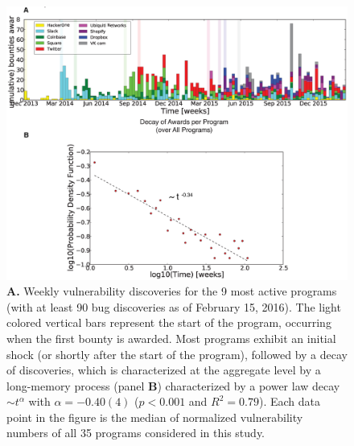 \begin{figure}[Ht]
\begin{center}
\includegraphics[width=13cm]{figures/timeline.eps}
\caption{{\bf A.} Weekly vulnerability discoveries for the 9 most active programs (with at least 90 bug discoveries as of February 15, 2016). The light colored vertical bars represent the start of the program, occurring when the first bounty is awarded. Most programs exhibit an initial shock (or shortly after the start of the program), followed by a decay of discoveries, which is characterized at the aggregate level by a long-memory process (panel {\bf B}) characterized by a power law decay $\sim t^{\alpha}$ with $\alpha = -0.40(4)$ ($p < 0.001$ and $R^2 = 0.79$). Each data point in the figure is the median of normalized vulnerability numbers of all 35 programs considered in this study.}
\label{timeline}
\end{center}
\end{figure}


